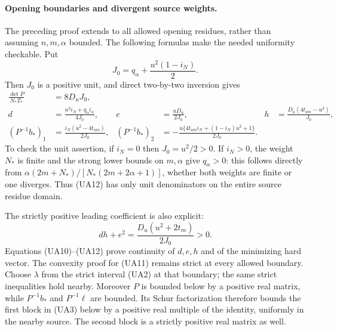 \paragraph{Opening boundaries and divergent source weights.}
The preceding proof extends to all allowed opening residues, rather
than assuming $n,m,\alpha$ bounded. The following formulas make the
needed uniformity checkable. Put
\[
 J_0=q_\alpha+\frac{u^2(1-i_N)}2.
\]
Then $J_0$ is a positive unit, and direct two-by-two inversion gives
\[
\begin{aligned}
 \frac{\det P}{N_*T_*}&=8D_uJ_0,\\
 d&=\frac{u^2i_N+q_\alpha i_\alpha}{4J_0},&
 e&=\frac{uD_u}{2J_0},&
 h&=\frac{D_u(4t_{am}-u^2)}{J_0},\\
 (P^{-1}b_*)_1&=\frac{i_N(u^2-4t_{am})}{2J_0},&
 (P^{-1}b_*)_2&=-\frac{u\{4t_{am}i_N+(1-i_N)u^2+1\}}{2J_0}.
\end{aligned}\tag{UA12}
\]
To check the unit assertion, if $i_N=0$ then $J_0=u^2/2>0$.
If $i_N>0$, the weight $N_*$ is finite and the strong lower bounds
on $m,\alpha$ give $q_\alpha>0$: this follows directly from
$\alpha(2m+N_*)/[N_*(2m+2\alpha+1)]$, whether both weights are
finite or one diverges. Thus (UA12) has only unit denominators on
the entire source residue domain.

The strictly positive leading coefficient is also explicit:
\[
 dh+e^2=\frac{D_u(u^2+2t_m)}{2J_0}>0.
\]
Equations (UA10)--(UA12) prove continuity of $d,e,h$ and of the
minimizing hard vector. The convexity proof for (UA11) remains strict
at every allowed boundary. Choose $\lambda$ from the strict interval
(UA2) at that boundary; the same strict inequalities hold nearby.
Moreover $P$ is bounded below by a positive real matrix, while
$P^{-1}b_*$ and $P^{-1}\ell$ are bounded. Its Schur factorization
therefore bounds the first block in (UA3) below by a positive real
multiple of the identity, uniformly in the nearby source. The second
block is a strictly positive real matrix as well.

